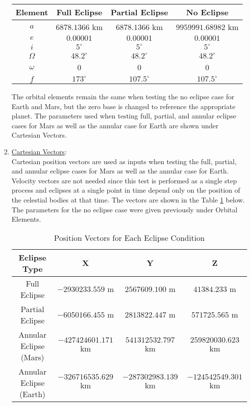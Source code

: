 \begin{enumerate}
\begin{table}[H]
		\centering \fontsize{10}{10}\selectfont
		\begin{tabular}{c|c|c|c}
			\hline \textbf{Element} & \textbf{Full Eclipse} & \textbf{Partial Eclipse} & \textbf{No Eclipse}\\ \hline $a$ & $6878.1366$ km & $6878.1366$ km & $9959991.68982$ km\\ $e$ & $0.00001$ & $0.00001$ & $0.00001$\\
			$i$ & $5^\circ$& $5^\circ$& $5^\circ$\\
			$\Omega$ & $48.2^\circ$& $48.2^\circ$& $48.2^\circ$\\
			$\omega$ & 0 & 0 & 0\\
			$f$ & $173^\circ$& $107.5^\circ$ & $107.5^\circ$\\
			\hline
		\end{tabular}
	\end{table}
	The orbital elements remain the same when testing the no eclipse case for Earth and Mars, but the zero base is changed to reference the appropriate planet. The parameters used when testing full, partial, and annular eclipse cases for Mars as well as the annular case for Earth are shown under Cartesian Vectors.
	\item \underline{Cartesian Vectors}:\\
	Cartesian position vectors are used as inputs when testing the full, partial, and annular eclipse cases for Mars as well as the annular case for Earth. Velocity vectors are not needed since this test is performed as a single step process and eclipses at a single point in time depend only on the position of the celestial bodies at that time. The vectors are shown in the Table \ref{tab:CartVec} below. The parameters for the no eclipse case were given previously under Orbital Elements.
	\begin{table}[H]
		\caption{Position Vectors for Each Eclipse Condition}\label{tab:CartVec}
		\centering \fontsize{10}{10}\selectfont
		\begin{tabular}{c|c|c|c}
			\hline \textbf{Eclipse Type} & \textbf{X} & \textbf{Y} & \textbf{Z}\\ \hline Full Eclipse & $-2930233.559$ m & $2567609.100$ m & $41384.233$ m\\ Partial Eclipse & $-6050166.455$ m & $2813822.447$ m& $571725.565$ m\\ Annular Eclipse (Mars) & $-427424601.171$ km & $541312532.797$ km & $259820030.623$ km\\ Annular Eclipse (Earth) & $-326716535.629$ km & $-287302983.139$ km & $-124542549.301$ km\\

\end{tabular}
\end{table}
\end{enumerate}
